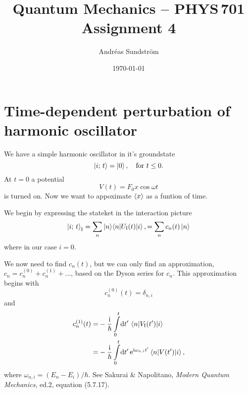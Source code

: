 \documentclass[11pt,letter, swedish, english
]{article}
\begin{document}
\title{Quantum Mechanics -- PHYS\,701 \\
Assignment 4}
\author{Andréas Sundström}
\date{\today}

\maketitle



\section{Time-dependent perturbation of harmonic oscillator}
\newcommand{\I}{\text{I}}
We have a simple harmonic oscillator in it's groundstate
\begin{equation}
\ket{i;\,t}=\ket{0}\qcomma
\text{for}\ t\le0.
\end{equation}
At $t=0$ a potential
\begin{equation}
V(t)=F_0x\cos\omega t
\end{equation}
is turned on. Now we want to appoximate $\ev{x}$ as a funtion of time.

We begin by expressing the stateket in the interaction picture
\begin{equation}
\ket{i;\,t}_\I = \sum_n \ket{n}\!\!\mel*{n}{U_\I(t)}{i},
=\sum_n c_n(t)\ket{n}
\end{equation}
where in our case $i=0$. 

We now need to find $c_n(t)$, but we can only find an approximation, 
$c_n=c_n^{(0)}+c_n^{(1)}+\ldots$, based on the Dyson series for
$c_n$. This approximation begins with
\begin{equation}
c_n^{(0)}(t)=\delta_{n,i}
\end{equation}
and
\begin{equation}
\begin{aligned}
c_n^{(1)}(t)=&-\frac{\ii}{\hbar}
\int_0^t\!\rd{t'}\, \mel{n}{V_\I(t')}{i}\\
=&-\frac{\ii}{\hbar}
\int_0^t\!\rd{t'} \,\ee^{\ii\omega_{n,i}t'}\mel{n}{V(t')}{i},
\end{aligned}
\end{equation}
where $\omega_{n,i}=(E_n-E_i)/\hbar$. See Sakurai \& Napolitano,
\textit{Modern Quantum Mechanics}, ed.2, equation (5.7.17).
\end{document}
